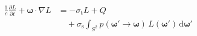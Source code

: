 \documentclass[border=2pt]{standalone}
\begin{document}
$\displaystyle\begin{aligned}
\frac{1}{c}\frac{\partial L}{\partial t}
+ \boldsymbol{\omega}\!\cdot\!\nabla L
&= -\sigma_{\mathrm{t}}L + Q \\[5pt]
&\quad+\sigma_{\mathrm{s}}\!\int_{S^{2}}
p(\boldsymbol{\omega}'\!\to\!\boldsymbol{\omega})\,
L(\boldsymbol{\omega}')\,\mathrm{d}\boldsymbol{\omega}'
\end{aligned}$
\end{document}
